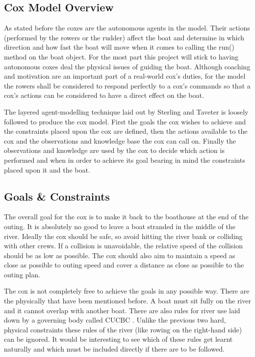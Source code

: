       \subsection{Cox Model Overview}
      As stated before the coxes are the autonomous agents in the model. Their actions (performed by the rowers or the rudder) affect the boat and determine in which direction and how fast the boat will move when it comes to calling the run() method on the boat object. For the most part this project will stick to having autonomous coxes deal the physical issues of guiding the boat. Although coaching and motivation are an important part of a real-world cox's duties, for the model the rowers shall be considered to respond perfectly to a cox's commands so that a cox's actions can be considered to have a direct effect on the boat.
      
      The layered agent-modelling technique laid out by Sterling and Taveter \cite{Sterling2009} is loosely followed to produce the cox model. First the goals the cox wishes to achieve and the constraints placed upon the cox are defined, then the actions available to the cox and the observations and knowledge base the cox can call on. Finally the observations and knowledge are used by the cox to decide which action is performed and when in order to achieve its goal bearing in mind the constraints placed upon it and the boat.

      \subsection{Goals \& Constraints}
      The overall goal for the cox is to make it back to the boathouse at the end of the outing. It is absolutely no good to leave a boat stranded in the middle of the river. Ideally the cox should be safe, so avoid hitting the river bank or colliding with other crews. If a collision is unavoidable, the relative speed of the collision should be as low as possible. The cox should also aim to maintain a speed as close as possible to outing speed and cover a distance as close as possible to the outing plan.
      
      The cox is not completely free to achieve the goals in any possible way. There are the physically that have been mentioned before. A boat must sit fully on the river and it cannot overlap with another boat. There are also rules for river use laid down by a governing body called CUCBC \cite{CUCBC}. Unlike the previous two hard, physical constraints these rules of the river (like rowing on the right-hand side) can be ignored. It would be interesting to see which of these rules get learnt naturally and which must be included directly if there are to be followed.
      
